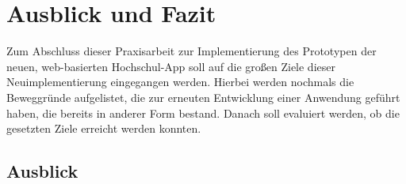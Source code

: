 \chapter{Ausblick und Fazit}
\label{sec:ausblick_fazit}

Zum Abschluss dieser Praxisarbeit zur Implementierung des Prototypen der neuen, web-basierten Hochschul-\ac{App} soll auf die großen Ziele dieser Neuimplementierung eingegangen werden. Hierbei werden nochmals die Beweggründe aufgelistet, die zur erneuten Entwicklung einer Anwendung geführt haben, die bereits in anderer Form bestand. Danach soll evaluiert werden, ob die gesetzten Ziele erreicht werden konnten.

\section{Ausblick\label{sec:ausblick}}

